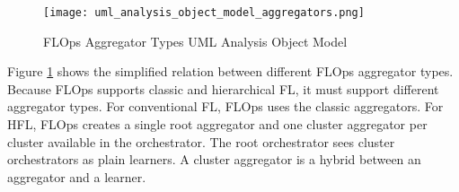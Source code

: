 \begin{figure}[h]
    \centering
    \texttt{[image: uml\_analysis\_object\_model\_aggregators.png]}
    \caption{FLOps Aggregator Types UML Analysis Object Model}
    \label{fig:uml_project_aggregators_analysis_object_model}
\end{figure}

Figure \ref{fig:uml_project_aggregators_analysis_object_model} shows the simplified relation between different FLOps aggregator types.
Because FLOps supports classic and hierarchical FL, it must support different aggregator types.
For conventional FL, FLOps uses the classic aggregators.
For HFL, FLOps creates a single root aggregator and one cluster aggregator per cluster available in the orchestrator.
The root orchestrator sees cluster orchestrators as plain learners.
A cluster aggregator is a hybrid between an aggregator and a learner.